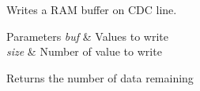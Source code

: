 Writes a R\-A\-M buffer on C\-D\-C line. 


\begin{DoxyParams}{Parameters}
{\em buf} & Values to write \\
\hline
{\em size} & Number of value to write\\
\hline
\end{DoxyParams}
\begin{DoxyReturn}{Returns}
the number of data remaining 
\end{DoxyReturn}
